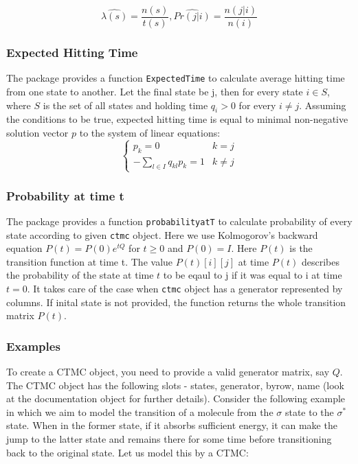 \documentclass[
  nojss]{jss}
\begin{document}
\[
\hat{\lambda(s)} = \frac{n(s)}{t(s)},\hat{Pr(j|i)}=\frac{n(j|i)}{n(i)}
\]

\hypertarget{expected-hitting-time}{%
\subsubsection{Expected Hitting Time}\label{expected-hitting-time}}

The package provides a function \texttt{ExpectedTime} to calculate average hitting time from one state to another. Let the final state be j, then for every state \(i \in S\), where \(S\) is the set of all states and holding time \(q_{i} > 0\) for every \(i \neq j\). Assuming the conditions to be true, expected hitting time is equal to minimal non-negative solution vector \(p\) to the system of linear equations:
\begin{equation}
\begin{cases}
      p_{k} = 0 & k = j \\
      -\sum_{l \in I} q_{kl}p_{k} = 1 & k \neq j
\end{cases}
\label{eq:EHT}
\end{equation}

\hypertarget{probability-at-time-t}{%
\subsubsection{Probability at time t}\label{probability-at-time-t}}

The package provides a function \texttt{probabilityatT} to calculate probability of every state according to given \texttt{ctmc} object. Here we use Kolmogorov's backward equation \(P(t) = P(0)e^{tQ}\) for \(t \geq 0\) and \(P(0) = I\). Here \(P(t)\) is the transition function at time t. The value \(P(t)[i][j]\) at time \(P(t)\) describes the probability of the state at time \(t\) to be eqaul to j if it was equal to i at time \(t=0\).
It takes care of the case when \texttt{ctmc} object has a generator represented by columns.
If inital state is not provided, the function returns the whole transition matrix \(P(t)\).

\hypertarget{examples}{%
\subsubsection{Examples}\label{examples}}

To create a CTMC object, you need to provide a valid generator matrix, say \(Q\). The CTMC object has the following slots - states, generator, byrow, name (look at the documentation object for further details). Consider the following example in which we aim to model the transition of a molecule from the \(\sigma\) state to the \(\sigma^*\) state. When in the former state, if it absorbs sufficient energy, it can make the jump to the latter state and remains there for some time before transitioning back to the original state. Let us model this by a CTMC:
\end{document}
